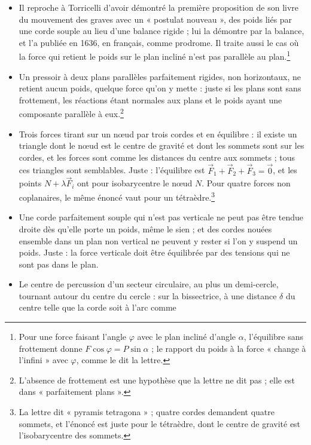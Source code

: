 \documentclass[11pt,a4paper]{article}
\begin{document}
\begin{itemize}
  \item Il reproche à Torricelli d'avoir démontré la première proposition de son
    livre du mouvement des graves avec un « postulat nouveau », des poids liés par
    une corde souple au lieu d'une balance rigide ; lui la démontre par la
    balance, et l'a publiée en 1636, en français, comme prodrome. Il traite aussi
    le cas où la force qui retient le poids sur le plan incliné n'est pas
    parallèle au plan.\footnote{Pour une force faisant l'angle $\varphi$ avec le
    plan incliné d'angle $\alpha$, l'équilibre sans frottement donne
    $F\cos\varphi = P\sin\alpha$ ; le rapport du poids à la force « change à
    l'infini » avec $\varphi$, comme le dit la lettre.}
  \item Un pressoir à deux plans parallèles parfaitement rigides, non
    horizontaux, ne retient aucun poids, quelque force qu'on y mette : juste si
    les plans sont sans frottement, les réactions étant normales aux plans et le
    poids ayant une composante parallèle à eux.\footnote{L'absence de frottement
    est une hypothèse que la lettre ne dit pas ; elle est dans « parfaitement
    plans ».}
  \item Trois forces tirant sur un nœud par trois cordes et en équilibre : il
    existe un triangle dont le nœud est le centre de gravité et dont les sommets
    sont sur les cordes, et les forces sont comme les distances du centre aux
    sommets ; tous ces triangles sont semblables. Juste : l'équilibre est
    $\vec F_1+\vec F_2+\vec F_3 = \vec 0$, et les points $N+\lambda\vec F_i$ ont
    pour isobarycentre le nœud $N$. Pour quatre forces non coplanaires, le même
    énoncé vaut pour un tétraèdre.\footnote{La lettre dit « pyramis tetragona » ;
    quatre cordes demandent quatre sommets, et l'énoncé est juste pour le
    tétraèdre, dont le centre de gravité est l'isobarycentre des sommets.}
  \item Une corde parfaitement souple qui n'est pas verticale ne peut pas être
    tendue droite dès qu'elle porte un poids, même le sien ; et des cordes nouées
    ensemble dans un plan non vertical ne peuvent y rester si l'on y suspend un
    poids. Juste : la force verticale doit être équilibrée par des tensions qui
    ne sont pas dans le plan.
  \item Le centre de percussion d'un secteur circulaire, au plus un
    demi-cercle, tournant autour du centre du cercle : sur la bissectrice, à une
    distance $\delta$ du centre telle que la corde soit à l'arc comme

\end{itemize}
\end{document}
